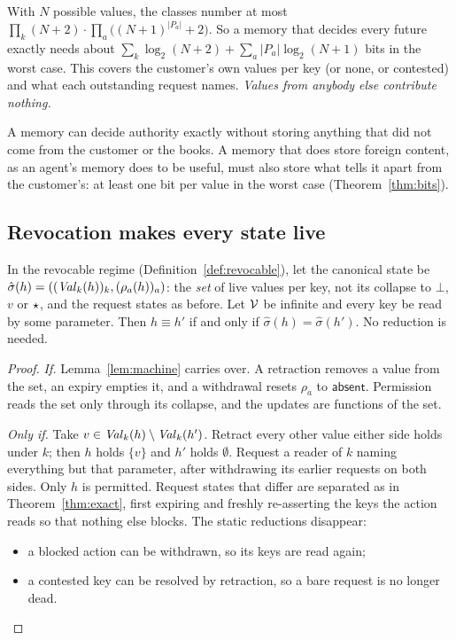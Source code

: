 \begin{corollary}\label{cor:size}
With $N$ possible values, the classes number at most
$\prod_k (N + 2) \cdot \prod_a \big( (N + 1)^{|P_a|} + 2 \big)$. So a memory that decides every
future exactly needs about
$\sum_k \log_2 (N + 2) + \sum_a |P_a| \log_2 (N + 1)$ bits in the worst case. This covers the
customer's own values per key (or none, or contested) and what each outstanding request names.
\emph{Values from anybody else contribute nothing.}
\end{corollary}

\begin{corollary}\label{cor:dichotomy}
A memory can decide authority exactly without storing anything that did not come from the
customer or the books. A memory that does store foreign content, as an agent's memory does to be
useful, must also store what tells it apart from the customer's: at least one bit per value in the
worst case (Theorem~\ref{thm:bits}).
\end{corollary}

\subsection*{Revocation makes every state live}

\begin{theorem}\label{thm:exact-rev}
In the revocable regime (Definition~\ref{def:revocable}), let the canonical state be
$\hat\sigma(h) = ((\mathit{Val}_k(h))_k, (\rho_a(h))_a)$: the \emph{set} of live values per key, not its
collapse to $\bot$, $v$ or $\star$, and the request states as before. Let $\mathcal{V}$ be infinite and
every key be read by some parameter. Then $h \equiv h'$ if and only if
$\hat\sigma(h) = \hat\sigma(h')$. No reduction is needed.
\end{theorem}
\begin{proof}
\emph{If.} Lemma~\ref{lem:machine} carries over. A retraction removes a value from the set, an
expiry empties it, and a withdrawal resets $\rho_a$ to $\mathsf{absent}$. Permission reads the set
only through its collapse, and the updates are functions of the set.

\emph{Only if.} Take $v \in \mathit{Val}_k(h) \setminus \mathit{Val}_k(h')$. Retract every other value either side
holds under $k$; then $h$ holds $\{v\}$ and $h'$ holds $\emptyset$. Request a reader of $k$ naming
everything but that parameter, after withdrawing its earlier requests on both sides. Only $h$ is
permitted. Request states that differ are separated as in Theorem~\ref{thm:exact}, first
expiring and freshly re-asserting the keys the action reads so that nothing else blocks. The
static reductions disappear:
\begin{itemize}
\item a blocked action can be withdrawn, so its keys are read again;
\item a contested key can be resolved by retraction, so a bare request is no longer dead.
\end{itemize}
\end{proof}

